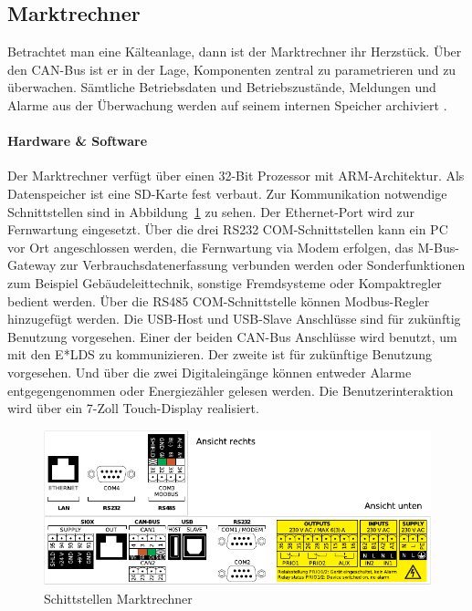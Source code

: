 \documentclass[11pt,a4paper]{report}
\begin{document}
\subsection{Marktrechner} \label{sec:marktrechner} 
Betrachtet man eine Kälteanlage, dann ist der Marktrechner ihr Herzstück. Über den CAN-Bus ist er in der Lage, Komponenten zentral zu parametrieren und zu überwachen. Sämtliche Betriebsdaten und Betriebszustände, Meldungen und Alarme aus der Überwachung werden auf seinem internen Speicher archiviert \cite{elds}.

\paragraph{Hardware \& Software} Der Marktrechner verfügt über einen 32-Bit Prozessor mit ARM-Architektur. Als Datenspeicher ist eine SD-Karte fest verbaut. Zur Kommunikation notwendige Schnittstellen sind in Abbildung~\ref{fig:marktrechner_interfaces} zu sehen. Der Ethernet-Port wird zur Fernwartung eingesetzt. Über die drei RS232 COM-Schnittstellen kann ein PC vor Ort angeschlossen werden, die Fernwartung via Modem erfolgen, das M-Bus-Gateway zur Verbrauchsdatenerfassung verbunden werden oder Sonderfunktionen zum Beispiel Gebäudeleittechnik, sonstige Fremdsysteme oder Kompaktregler bedient werden. Über die RS485 COM-Schnittstelle können Modbus-Regler hinzugefügt werden. Die USB-Host und USB-Slave Anschlüsse sind für zukünftig Benutzung vorgesehen. Einer der beiden CAN-Bus Anschlüsse wird benutzt, um mit den E*LDS zu kommunizieren. Der zweite ist für zukünftige Benutzung vorgesehen. Und über die zwei Digitaleingänge können entweder Alarme entgegengenommen oder Energiezähler gelesen werden. Die Benutzerinteraktion wird über ein 7-Zoll Touch-Display realisiert.

\begin{figure}[htbp]
\centering
\includegraphics[scale=1.1]{images/CI4000_Hardware_Sticker.pdf}
\caption{Schittstellen Marktrechner}
\label{fig:marktrechner_interfaces}
\end{figure}
\end{document}
